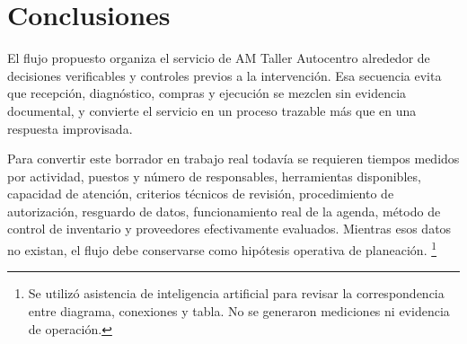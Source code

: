 {\section{Conclusiones}

El flujo propuesto organiza el servicio de AM Taller Autocentro alrededor de decisiones verificables y controles previos a la intervención. Esa secuencia evita que recepción, diagnóstico, compras y ejecución se mezclen sin evidencia documental, y convierte el servicio en un proceso trazable más que en una respuesta improvisada.

Para convertir este borrador en trabajo real todavía se requieren tiempos medidos por actividad, puestos y número de responsables, herramientas disponibles, capacidad de atención, criterios técnicos de revisión, procedimiento de autorización, resguardo de datos, funcionamiento real de la agenda, método de control de inventario y proveedores efectivamente evaluados. Mientras esos datos no existan, el flujo debe conservarse como hipótesis operativa de planeación.
\footnote{Se utilizó asistencia de inteligencia artificial para revisar la correspondencia entre diagrama, conexiones y tabla. No se generaron mediciones ni evidencia de operación.}
}

